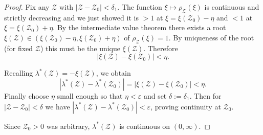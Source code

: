 \documentclass[a4paper,11pt]{amsart}
\theoremstyle{definition}
\numberwithin{equation}{section}
\theoremstyle{definition}
\begin{document}
\begin{proof}
Fix any \(\mathcal Z\) with \(|\mathcal Z-\mathcal Z_0|<\delta_1\). The function \(\xi\mapsto\rho_{\mathcal Z}(\xi)\)
is continuous and strictly decreasing and we just showed it is \(>1\) at \(\xi=\xi(\mathcal Z_0)-\eta\) and \(<1\)
at \(\xi=\xi(\mathcal Z_0)+\eta\). By the intermediate value theorem there exists a root \(\xi(\mathcal Z)\in
(\xi(\mathcal Z_0)-\eta,\xi(\mathcal Z_0)+\eta)\) of \(\rho_{\mathcal Z}(\xi)=1\). By uniqueness of the root
(for fixed \(\mathcal Z\)) this must be the unique \(\xi(\mathcal Z)\). Therefore
\[
|\xi(\mathcal Z)-\xi(\mathcal Z_0)|<\eta.
\]

Recalling  \(\lambda^\ast(\mathcal Z)=-\xi(\mathcal Z)\), we obtain
\[
|\lambda^\ast(\mathcal Z)-\lambda^\ast(\mathcal Z_0)| = |\xi(\mathcal Z)-\xi(\mathcal Z_0)| < \eta.
\]
Finally choose \(\eta\) small enough so that \(\eta<\varepsilon\) and set \(\delta:=\delta_1\). Then for
\(|\mathcal Z-\mathcal Z_0|<\delta\) we have \(|\lambda^\ast(\mathcal Z)-\lambda^\ast(\mathcal Z_0)|<\varepsilon\),
proving continuity at \(\mathcal Z_0\).

Since \(\mathcal Z_0>0\) was arbitrary, \(\lambda^\ast(\mathcal Z)\) is continuous on \((0,\infty)\).

\end{proof}
\end{document}
